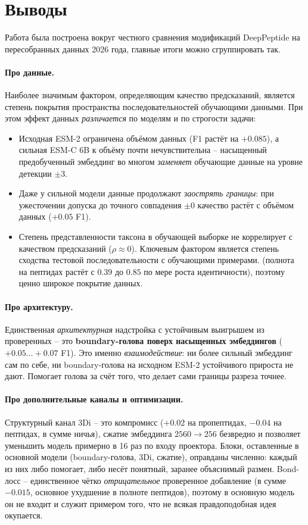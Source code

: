 \documentclass{article}
\begin{document}
\section{Выводы}
Работа была построена вокруг честного сравнения модификаций DeepPeptide на пересобранных данных 2026 года, главные итоги можно сгруппировать так.

\paragraph{Про данные.} Наиболее значимым фактором, определяющим качество предсказаний, является степень покрытия пространства последовательностей обучающими данными. При этом эффект данных \emph{различается} по моделям и по строгости задачи:
\begin{itemize}
  \item Исходная ESM-2 ограничена объёмом данных (F1 растёт на ${+}0.085$), а сильная ESM-C 6B к объёму почти нечувствительна -- насыщенный предобученный эмбеддинг во многом \emph{заменяет} обучающие данные на уровне детекции $\pm3$.
  \item  Даже у сильной модели данные продолжают \emph{заострять границы}: при ужесточении допуска до точного совпадения $\pm0$ качество растёт с объёмом данных (${+}0.05$ F1).
  \item Степень представленности таксона в обучающей выборке не коррелирует с качеством предсказаний ($\rho\approx 0$). Ключевым фактором является степень сходства тестовой последовательности с обучающими примерами. (полнота на пептидах растёт с $0.39$ до $0.85$ по мере роста идентичности), поэтому ценно широкое покрытие данных.
\end{itemize}

\paragraph{Про архитектуру.} Единственная \emph{архитектурная} надстройка с устойчивым выигрышем из проверенных -- это \textbf{boundary-голова поверх насыщенных эмбеддингов} (${+}0.05\dots{+}0.07$ F1). Это именно \emph{взаимодействие}: ни более сильный эмбеддинг сам по себе, ни boundary-голова на исходном ESM-2 устойчивого прироста не дают. Помогает голова за счёт того, что делает сами границы разреза точнее.

\paragraph{Про дополнительные каналы и оптимизации.} Структурный канал 3Di -- это компромисс (${+}0.02$ на пропептидах, ${-}0.04$ на пептидах, в сумме ничья), сжатие эмбеддинга $2560\to256$ безвредно и позволяет уменьшить модель примерно в 16 раз по входу проектора. Блоки, оставленные в основной модели (boundary-голова, 3Di, сжатие), оправданы численно: каждый из них либо помогает, либо несёт понятный, заранее объяснимый размен. Bond-лосс -- единственное чётко \emph{отрицательное} проверенное добавление (в сумме ${-}0.015$, основное ухудшение в полноте пептидов), поэтому в основную модель он не входит и служит примером того, что не всякая правдоподобная идея окупается.
\end{document}

